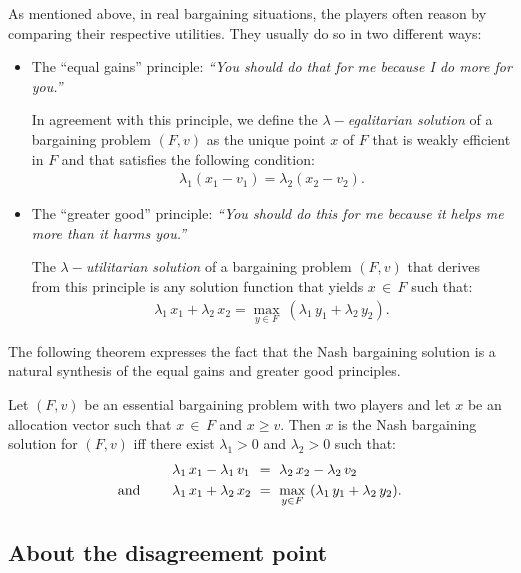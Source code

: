 As mentioned above, in real bargaining situations, the players often reason by comparing their respective utilities. They usually do so in two different ways:
\begin{itemize}
\renewcommand{\labelitemi}{$\bullet$}
	\item The ``equal gains'' principle: \emph{``You should do that for me because I do more for you.''}

	In agreement with this principle, we define the \emph{$\lambda-$egalitarian solution} of a bargaining problem $(F, v)$ as the unique point $x$ of $F$ that is weakly efficient in $F$ and that satisfies the following condition:
	\begin{align*}
		\lambda_1 (x_1 - v_1) = \lambda_2 (x_2 - v_2).
	\end{align*}

	\item The ``greater good'' principle: \emph{``You should do this for me because it helps me more than it harms you.''}

	The \emph{$\lambda-$utilitarian solution} of a bargaining problem $(F, v)$ that derives from this principle is any solution function that yields $x \, \in \, F$ such that:
	\begin{align*}
		\lambda_1 \, x_1 + \lambda_2 \, x_2 = \max_{y \in F} \ (\lambda_1 \, y_1 + \lambda_2 \, y_2).
	\end{align*}
\end{itemize}
The following theorem expresses the fact that the Nash bargaining solution is a natural synthesis of the equal gains and greater good principles.

\begin{theorem}
Let $(F, v)$ be an essential bargaining problem with two players and let $x$ be an allocation vector such that $x \, \in \, F$ and $x \geq v$. Then $x$ is the Nash bargaining solution for $(F, v)$ iff there exist $\lambda_1 > 0$ and $\lambda_2 > 0$ such that:
\begin{align*}
	& \lambda_1 \, x_1 - \lambda_1 \, v_1 \hspace{.03cm} \ = \ \lambda_2 \, x_2 - \lambda_2 \, v_2  \\
	\text{and} \qquad \; & \lambda_1 \, x_1 + \lambda_2 \, x_2 \ = \ \max_{y \in F} \ (\lambda_1 \, y_1 + \lambda_2 \, y_2).
\end{align*}
\end{theorem}



\subsection{About the disagreement point} \label{sec:disagreement}



